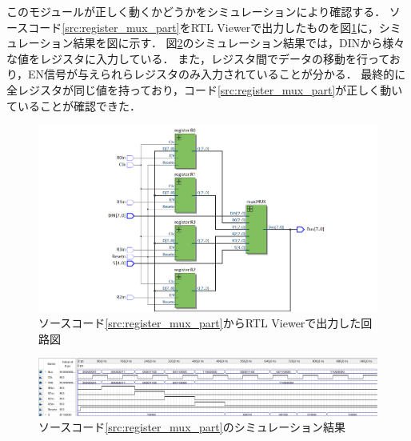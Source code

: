 \documentclass{jlreq}
\numberwithin{equation}{section}
\begin{document}
このモジュールが正しく動くかどうかをシミュレーションにより確認する．
ソースコード\ref{src:register_mux_part}をRTL Viewerで出力したものを図\ref{fig:jisshu1_RTL}に，シミュレーション結果を図に示す．
図\ref{fig:jisshu1_sim}のシミュレーション結果では，DINから様々な値をレジスタに入力している．
また，レジスタ間でデータの移動を行っており，EN信号が与えられらレジスタのみ入力されていることが分かる．
最終的に全レジスタが同じ値を持っており，コード\ref{src:register_mux_part}が正しく動いていることが確認できた．
\begin{figure}[H]
	\centering
	\includegraphics[width=\textwidth]{assets/jisshu1_RTL.png}
	\caption{ソースコード\ref{src:register_mux_part}からRTL Viewerで出力した回路図}
	\label{fig:jisshu1_RTL}
\end{figure}

\begin{figure}[H]
	\centering
	\includegraphics[width=\textwidth]{assets/jisshu1_sim.png}
	\caption{ソースコード\ref{src:register_mux_part}のシミュレーション結果}
	\label{fig:jisshu1_sim}
\end{figure}
\end{document}

